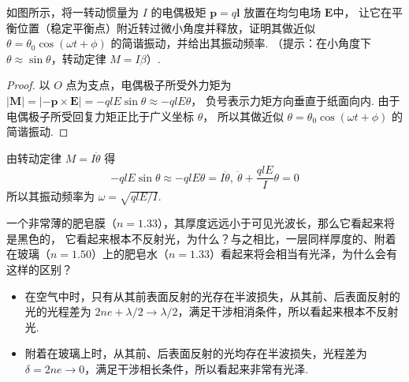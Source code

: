 \begin{textfig}
  \begin{problem}[本题6分]
    如图所示，将一转动惯量为 $I$ 的电偶极矩 $\bm p = q\bm l$ 放置在均匀电场 $\bm E$中，
    让它在平衡位置（稳定平衡点）附近转过微小角度并释放，证明其做近似
    $\theta = \theta_0 \cos(\omega t + \phi)$ 的简谐振动，并给出其振动频率.
    （提示：在小角度下 $\theta \approx \sin\theta$，转动定律 $M = I\beta$）.
  \end{problem}
  \textfigsplit\centering
\end{textfig}
\scratch[12ex]
\begin{solution}
  \begin{proof}
    以 $O$ 点为支点，电偶极子所受外力矩为
    $|\bm M| = |-\bm p \times \bm E| = -qlE\sin\theta \approx -qlE\theta$，
    负号表示力矩方向垂直于纸面向内. 由于电偶极子所受回复力矩正比于广义坐标 $\theta$，
    所以其做近似 $\theta = \theta_0 \cos(\omega t + \phi)$ 的简谐振动.
  \end{proof}
  由转动定律 $M = I\ddot\theta$ 得
  \[
    -qlE\sin\theta \approx -qlE\theta = I\ddot\theta,~
    \ddot\theta + \frac{qlE}{I}\theta = 0
  \]
  所以其振动频率为 $\omega = \sqrt{qlE/I}$.
\end{solution}

\begin{problem}[本题8分]
  一个非常薄的肥皂膜（$n = 1.33$），其厚度远远小于可见光波长，那么它看起来将是黑色的，
  它看起来根本不反射光，为什么？与之相比，一层同样厚度的、附着在玻璃（$n = 1.50$）上的肥皂水（$n = 1.33$）看起来将会相当有光泽，为什么会有这样的区别？
\end{problem}
\scratch[8ex]
\begin{solution}\leavevmode
  \begin{itemize}
    \item 在空气中时，只有从其前表面反射的光存在半波损失，从其前、后表面反射的光的光程差为
    $2ne + \lambda/2 \to \lambda/2$，满足干涉相消条件，所以看起来根本不反射光.
    \item 附着在玻璃上时，从其前、后表面反射的光均存在半波损失，光程差为 $\delta = 2ne \to 0$，满足干涉相长条件，所以看起来非常有光泽.
  \end{itemize}
\end{solution}

